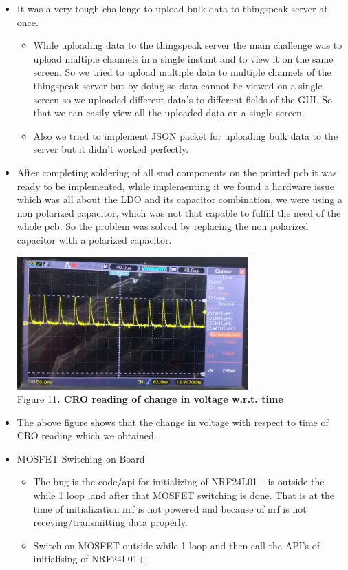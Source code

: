 \documentclass[a4paper,12pt,oneside]{book}
\begin{document}
\begin{itemize}
\begin{itemize}
        \end{itemize}
        \item It was a very tough challenge to upload bulk data to thingspeak server at once. 
        \begin{itemize}
        \item While uploading data to the thingspeak server the main challenge was to upload multiple channels in a single instant and to view it on the same screen. So we tried to upload multiple data to multiple channels of the thingspeak server but by doing so data cannot be viewed on a single screen so we uploaded different data's to different fields of the GUI. So that we can easily view all the uploaded data on a single screen.
        \item Also we tried to implement JSON packet for uploading bulk data to the server but it didn't worked perfectly.
        \end{itemize}
        \item After completing soldering of all smd components on the printed pcb it was ready to be implemented, while implementing it we found a hardware issue which was all about the LDO and its capacitor combination, we were using a non polarized capacitor, which was not that capable to fulfill the need of the whole pcb. So the problem was solved by replacing the non polarized capacitor with a polarized capacitor.
        \begin{center}
          \includegraphics[width=0.7\textwidth]{deltavoltage.jpg}\\
          \small{Figure 11\textbf{. CRO reading of change in voltage w.r.t. time}}\\
          \end{center}
          \item The above figure shows that the change in voltage with respect to time of  CRO reading which we obtained.
 \item MOSFET Switching on Board
 	\begin{itemize}
 	\item The bug is the code/api for initializing of NRF24L01+ is outside the while 1 loop ,and after that MOSFET switching is done.
    That is at the time of initialization nrf is not powered and because of nrf is not receving/transmitting data properly.
    \item Switch on MOSFET outside while 1 loop and then call the API's of initialising of NRF24L01+.
 	\end{itemize}

	\end{itemize}
\end{document}
